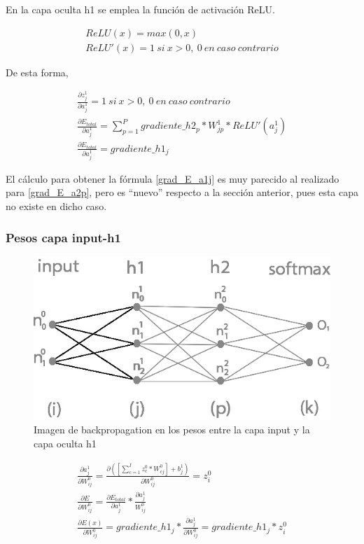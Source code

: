En la capa oculta h1 se emplea la función de activación ReLU. 

\begin{gather}
	ReLU(x) = max(0, x) \\
	ReLU'(x) = 1\ si\ x>0,\ 0\ en\ caso\ contrario
\end{gather}

De esta forma,


\begin{gather}
	\frac{\partial z^1_ j}{\partial a^1_j} = 1\ si\ x>0,\ 0\ en\ caso\ contrario \\
	\frac{\partial E_{total}}{\partial a^1_j} = \sum_{p=1}^P  gradiente\_h2_p * W^1_{jp} * ReLU'(a^1_j) \\
	\frac{\partial E_{total}}{\partial a^1_j} = gradiente\_h1_j
	\label{grad_E_a1j}
\end{gather}

El cálculo para obtener la fórmula \ref{grad_E_a1j} es muy parecido al realizado para \ref{grad_E_a2p}, pero es ``nuevo'' respecto a la sección anterior, pues esta capa no existe en dicho caso. \\


\subsubsection{Pesos capa input-h1}

\begin{figure}[H]
	\centering
	\includegraphics[scale=0.35]{imagenes/nn_2_capa_pesos_input_h1.jpg}  
	\caption{Imagen de backpropagation en los pesos entre la capa input y la capa oculta h1}
	\label{fig:nn_2_pesos_input_h1}
\end{figure}


\begin{gather}
	\frac{\partial a^1_j }{\partial W^0_{ij} } = \frac{\partial ([\sum_{c=1}^{I} z^0_c * W^0_{cj}] + b^1_j)}{\partial W^0_{ij} } = z^0_i \\
	\frac{\partial E}{\partial W^0_{ij}} = \frac{\partial E_{total} }{\partial a^1_j } * \frac{\partial a^1_j}{W^0_{ij}} \\
	\frac{\partial E(x) }{\partial W^0_{ij} } = gradiente\_h1_j * \frac{\partial a^1_j }{\partial W^0_{ij} } = gradiente\_h1_j * z^0_i 
\end{gather}

